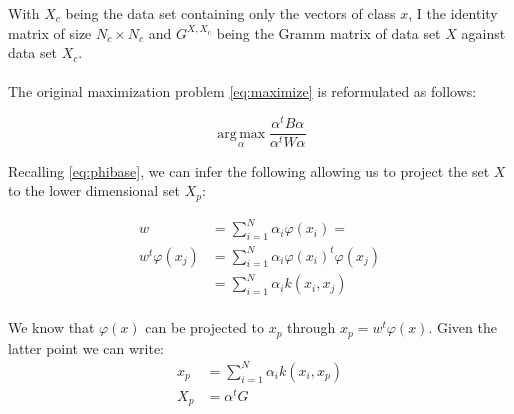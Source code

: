 With $X_c$ being the data set containing only the vectors of class $x$, $\textrm{I}$ the identity matrix of
size $N_c \times N_c$ and
$G^{X, X_c}$ being the Gramm matrix of data set $X$ against data set $X_c$.

\paragraph{}
The original maximization problem \ref{eq:maximize} is reformulated as follows:

\begin{equation*}
\label{eq:maximize2}
\boxed{\operatorname*{arg\,max}_\alpha \frac{\alpha^t B \alpha}{\alpha^t W \alpha}}
\end{equation*}

Recalling \ref{eq:phibase}, we can infer the following allowing us to project the set $X$ to the
lower dimensional set $X_p$:

\begin{align*}
  w &= \sum_{i=1}^N \alpha_i \varphi(x_i) = \\
  w^t \varphi(x_j) &= \sum_{i = 1}^N \alpha_i \varphi(x_i)^t \varphi(x_j)\\
                   &= \sum_{i = 1}^N \alpha_i k(x_i, x_j) \\
\end{align*}

We know that $\varphi(x)$ can be projected to $x_p$ through $x_p = w^t \varphi(x)$. Given the latter
point we can write:
\begin{align*}
x_p &= \sum_{i = 1}^N \alpha_i k(x_i, x_p) \\
X_p &= \alpha^t G \\
\end{align*}




